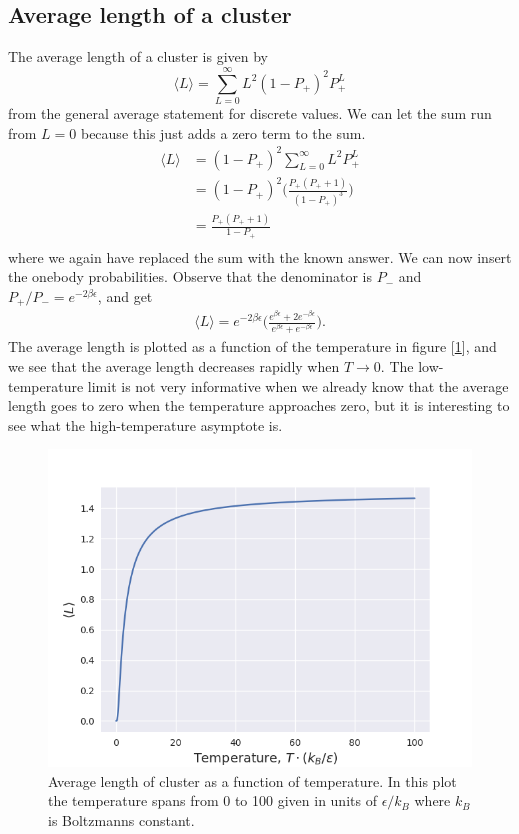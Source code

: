 \documentclass[norsk,a4paper,12pt]{article}
\begin{document}
\subsection{Average length of a cluster}
The average length of a cluster is given by
\begin{equation}
\langle L\rangle =\sum_{L=0}^{\infty}L^2(1-P_+)^2P_+^L
\end{equation}
from the general average statement for discrete values. We can let the sum run from $L=0$ because this just adds a zero term to the sum. 
\begin{align}
\langle L\rangle&=(1-P_+)^2\sum_{L=0}^{\infty}L^2P_+^L\\
&=(1-P_+)^2\bigg(\frac{P_+(P_++1)}{(1-P_+)^3}\bigg)\\
&=\frac{P_+(P_++1)}{1-P_+}\\
\end{align}
where we again have replaced the sum with the known answer. We can now insert the onebody probabilities. Observe that the denominator is  $P_-$ and $P_+/P_-=e^{-2\beta\epsilon}$, and get
\begin{align}
\langle L\rangle=e^{-2\beta\epsilon}\bigg(\frac{e^{\beta\epsilon}+2e^{-\beta\epsilon}}{e^{\beta\epsilon}+e^{-\beta\epsilon}}\bigg).
\end{align}
The average length is plotted as a function of the temperature in figure [\ref{y_time}], and we see that the average length decreases rapidly when $T\rightarrow0$. The low-temperature limit is not very informative when we already know that the average length goes to zero when the temperature approaches zero, but it is interesting to see what the high-temperature asymptote is. 

\begin{figure}[h]
\centering
\includegraphics[width=150mm]{1_4.png}
\caption{Average length of cluster as a function of temperature. In this plot the temperature spans from 0 to 100 given in units of $\epsilon/k_B$ where $k_B$ is Boltzmanns constant. \label{y_time}}
\end{figure}
\end{document}
